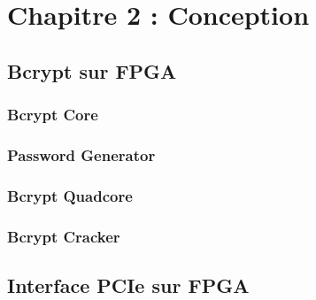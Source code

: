 \chapter{Chapitre 2 : Conception}


\section{Bcrypt sur FPGA}

\subsection{Bcrypt Core}

\subsection{Password Generator}

\subsection{Bcrypt Quadcore}

\subsection{Bcrypt Cracker}

\section{Interface PCIe sur FPGA}